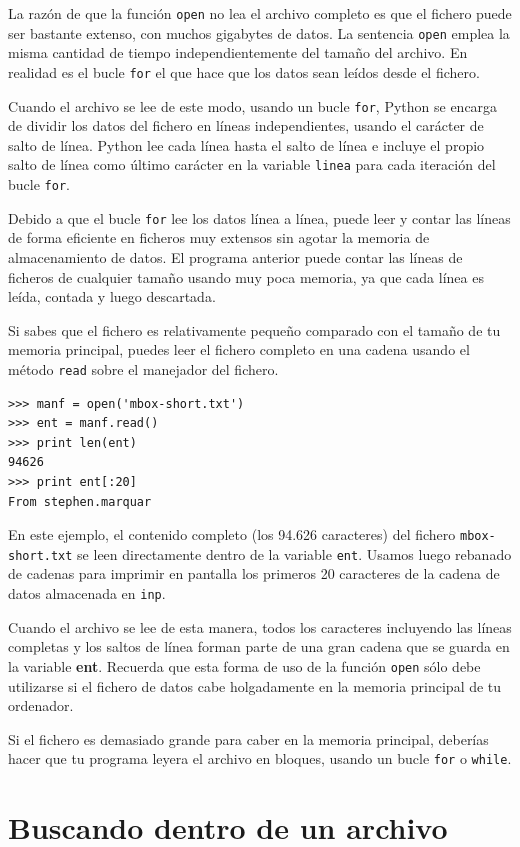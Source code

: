La razón de que la función {\tt open} no lea el archivo completo
es que el fichero puede ser bastante extenso, con muchos gigabytes de datos.
La sentencia {\tt open} emplea la misma cantidad de tiempo independientemente del
tamaño del archivo. En realidad es el bucle {\tt for} el que hace que
los datos sean leídos desde el fichero.

Cuando el archivo se lee de este modo, usando un bucle {\tt for}, Python
se encarga de dividir los datos del fichero en líneas independientes, usando
el carácter de salto de línea. Python lee cada línea hasta el
salto de línea e incluye
el propio salto de línea como último carácter en la variable {\tt linea} para
cada iteración del bucle {\tt for}.

Debido a que el bucle {\tt for} lee los datos línea a línea, puede
leer y contar las líneas de forma eficiente en ficheros muy extensos sin
agotar la memoria de almacenamiento de datos. El programa anterior puede
contar las líneas de ficheros de cualquier tamaño usando muy poca memoria,
ya que cada línea es leída, contada y luego descartada.

Si sabes que el fichero es relativamente pequeño comparado con el tamaño de
tu memoria principal, puedes leer el fichero completo en una cadena
usando el método {\tt read} sobre el manejador del fichero.

\beforeverb
\begin{verbatim}
>>> manf = open('mbox-short.txt')
>>> ent = manf.read()
>>> print len(ent)
94626
>>> print ent[:20]
From stephen.marquar
\end{verbatim}
\afterverb
%
En este ejemplo, el contenido completo (los 94.626 caracteres)
del fichero {\tt mbox-short.txt} se leen directamente dentro de la variable
{\tt ent}. Usamos luego rebanado de cadenas para imprimir en pantalla
los primeros 20 caracteres de la cadena de datos almacenada en {\tt inp}.

Cuando el archivo se lee de esta manera, todos los caracteres incluyendo
las líneas completas y los saltos de línea forman parte de una gran cadena
que se guarda en la variable {\bf ent}.
Recuerda que esta forma de uso de la función {\tt open} sólo debe utilizarse
si el fichero de datos cabe holgadamente en la memoria principal
de tu ordenador.

Si el fichero es demasiado grande para caber en la memoria principal, deberías
hacer que tu programa leyera el archivo en bloques, usando un bucle
{\tt for} o {\tt while}.

\section{Buscando dentro de un archivo}

